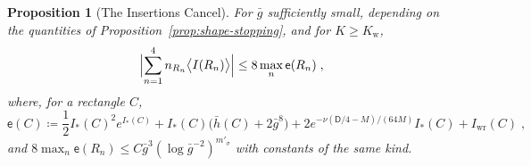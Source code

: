 \documentclass[11pt]{preprint}
\numberwithin{equation}{section}
\newtheorem{proposition}[theorem]{Proposition}
\theoremstyle{definition}
\theoremstyle{remark}
\theoremstyle{plain}
\begin{document}
\begin{proposition}[The Insertions Cancel]\label{prop:insertions-cancel}
For $\bar g$ sufficiently small, depending on the quantities of Proposition~\ref{prop:shape-stopping}, and for $K \geq K_{\mathrm w}$,
\begin{equation}\label{eq:insertions-cancel}
    \Bigl\lvert\sum_{n=1}^{4}n_{R_n}\bigl\langle I(R_n)\bigr\rangle\Bigr\rvert \leq 8\max_n\mathsf e(R_n)\;,
\end{equation}
where, for a rectangle $C$,
\begin{equation}\label{eq:insertion-error}
    \mathsf e(C) \coloneqq \frac12I_*(C)^2e^{I_*(C)} + I_*(C)\bigl(\bar h(C) + 2\bar g^8\bigr) + 2e^{-\nu(\mathsf D/4 - M)/(64M)}I_*(C) + I_{\mathrm{wr}}(C)\;,
\end{equation}
and $8\max_n\mathsf e(R_n) \leq C\bar g^3(\log\bar g^{-2})^{m'_\sigma}$ with constants of the same kind.
\end{proposition}
\end{document}

